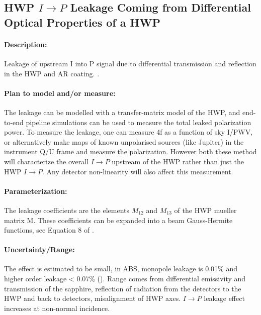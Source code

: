 \subsection{HWP $I \rightarrow P$ Leakage Coming from Differential Optical Properties of a HWP}

\paragraph{Description:}
Leakage of upstream I into P signal due to differential transmission and reflection in the HWP and AR coating.
\cite{Essinger-Hileman2013, Essinger-Hileman2016, ABS_HWP}. 

\paragraph{Plan to model and/or measure:}
The leakage can be modelled with a transfer-matrix model of the HWP, and end-to-end pipeline simulations can be used to measure the total leaked polarization power.
To measure the leakage, one can measure 4f as a function of sky I/PWV, or alternatively make maps of known unpolarised sources (like Jupiter) in the instrument Q/U frame
and measure the polarization. However both these method will characterize the overall $I \rightarrow P$ upstream of the HWP rather than just the HWP $I \rightarrow P$.
Any detector non-linearity will also affect this measurement.


\paragraph{Parameterization:}
The leakage coefficients are the elements $M_{12}$ and $M_{13}$ of the HWP mueller matrix M. These coefficients can be expanded into a beam Gauss-Hermite functions, 
see Equation 8 of \cite{Essinger-Hileman2016}. 

\paragraph{Uncertainty/Range:}
The effect is estimated to be small, in ABS, monopole leakage is 0.01\% and higher order leakage < 0.07\% (\cite{Essinger-Hileman2016}).
Range comes from differential emissivity and transmission of the sapphire, reflection of radiation from the detectors to the HWP and back to detectors, 
misalignment of HWP axes. $I \rightarrow P$ leakage effect increases at non-normal incidence.
